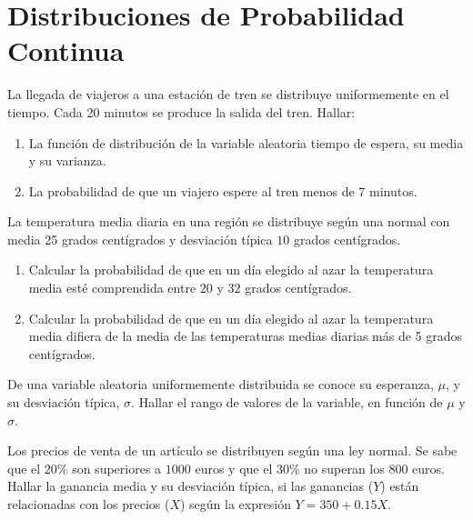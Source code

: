 \section{Distribuciones de Probabilidad Continua}

\begin{ejercicio}
    La llegada de viajeros a una estación de tren se distribuye uniformemente en el tiempo. Cada 20 minutos se produce la salida del tren. Hallar:
    \begin{enumerate}
        \item La función de distribución de la variable aleatoria tiempo de espera, su media y su varianza.
        \item La probabilidad de que un viajero espere al tren menos de 7 minutos.
    \end{enumerate}
\end{ejercicio}

\begin{ejercicio}
    La temperatura media diaria en una región se distribuye según una normal con media 25 grados centígrados y desviación típica $10$ grados centígrados.
    \begin{enumerate}
        \item Calcular la probabilidad de que en un día elegido al azar la temperatura media esté comprendida entre $20$ y $32$ grados centígrados.
        \item Calcular la probabilidad de que en un día elegido al azar la temperatura media difiera de la media de las temperaturas medias diarias más de 5 grados centígrados.
    \end{enumerate}
\end{ejercicio}

\begin{ejercicio}
    De una variable aleatoria uniformemente distribuida se conoce su esperanza, $\mu$, y su desviación típica, $\sigma$. Hallar el rango de valores de la variable, en función de $\mu$ y $\sigma$.
\end{ejercicio}

\begin{ejercicio}
    Los precios de venta de un artículo se distribuyen según una ley normal. Se sabe que el $20\%$ son superiores a $1000$ euros y que el $30\%$ no superan los $800$ euros. Hallar la ganancia media y su desviación típica, si las ganancias ($Y$) están relacionadas con los precios ($X$) según la expresión $Y = 350+0.15X$.
\end{ejercicio}

